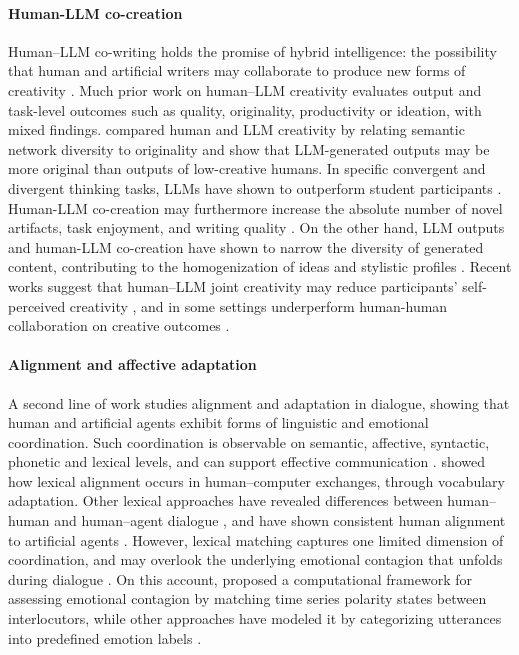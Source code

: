 \documentclass[11pt]{article}
\begin{document}
\paragraph{Human-LLM co-creation}
Human--LLM co-writing holds the promise of hybrid intelligence: the possibility that human and artificial writers may collaborate to produce new forms of creativity \cite{cheng2025inspiration}. Much prior work on human–LLM creativity evaluates output and task-level outcomes such as quality, originality, productivity or ideation, with mixed findings.\citet{Domanti_2026} compared human and LLM creativity by relating semantic network diversity to originality and show that LLM-generated outputs may be more original than outputs of low-creative humans. In specific convergent and divergent thinking tasks, LLMs have shown to outperform student participants \cite{arora2025generative}. Human-LLM co-creation may furthermore increase the absolute number of novel artifacts\cite{zhou2025expands}, task enjoyment, and writing quality \cite{noy2023experimental}. On the other hand, LLM outputs and human-LLM co-creation have shown to narrow the diversity of generated content, contributing to the homogenization of ideas and stylistic profiles \cite{wenger2025weredifferentweresame,anderson2024homogenization}. Recent works suggest that human--LLM joint creativity may reduce participants' self-perceived creativity \cite{luchini2025creative}, and in some settings underperform human-human collaboration on creative outcomes \cite{tang2025best}.

\paragraph{Alignment and affective adaptation}
A second line of work studies alignment and adaptation in dialogue, showing that human and artificial agents exhibit forms of linguistic and emotional coordination. Such coordination is observable on semantic, affective, syntactic, phonetic and lexical levels, and can support effective communication \cite{article, branigan2010linguistic}. \citet{koulouri2016and} showed how lexical alignment occurs in human--computer exchanges, through vocabulary adaptation. Other lexical approaches have revealed differences between human--human and human--agent dialogue \cite{duplessis2021towards, li2025ai}, and have shown consistent human alignment to artificial agents \cite{ostrand2023rapid}. However, lexical matching captures one limited dimension of coordination, and may overlook the underlying emotional contagion that unfolds during dialogue \cite{hatfield1993emotional}.  On this account, \citet{varni2017computational} proposed a computational framework for assessing emotional contagion by matching time series polarity states between interlocutors, while other approaches have modeled it by categorizing utterances into predefined emotion labels \cite{poria2019emotion}. %
\end{document}
